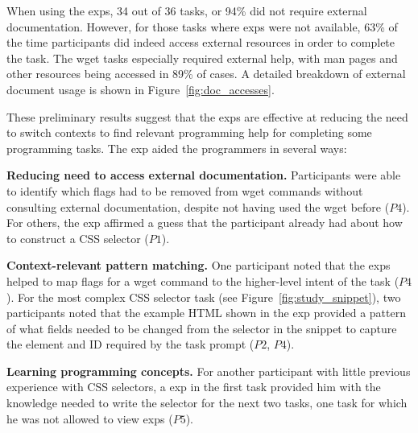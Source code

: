 When using the \glspl{exp}, 34 out of 36 tasks, or 94\% did not require external documentation.  However, for those tasks where \glspl{exp} were not available, 63\% of the time participants did indeed access external resources in order to complete the task.  The wget tasks especially required external help, with man pages and other resources being accessed in 89\% of cases.  
A detailed breakdown of external document usage is shown in Figure~\ref{fig:doc_accesses}. 





These preliminary results suggest that the \glspl{exp} are effective at reducing the need to switch contexts to find relevant programming help  for completing some programming tasks. 
The \gls{exp} aided the programmers in several ways:

{\bf Reducing need to access external documentation.}
Participants were  able to identify which flags had to be removed from wget commands without consulting external documentation, despite not having used the wget before ($P4$).
For others, the \gls{exp} affirmed a guess that the participant already had about how to construct a CSS selector ($P1$).

{\bf Context-relevant pattern matching.}
One participant noted that the \glspl{exp} helped  to map flags for a wget command to the higher-level intent of the task ($P4$). 
For the most complex CSS selector task (see Figure~\ref{fig:study_snippet}), two participants noted
that the example HTML shown in the \gls{exp} 
provided a pattern of what fields needed to be changed  from the selector in the snippet to capture the element and ID required by the task prompt ($P2$, $P4$).

{\bf Learning programming concepts.}
For another participant with little previous experience with CSS selectors, a \gls{exp} in  the first task provided him with the knowledge needed to write the selector for the next two tasks, one task for which he was not allowed to view \glspl{exp} ($P5$).

